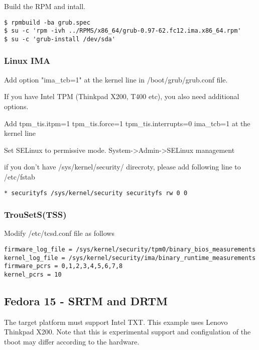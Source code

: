 Build the RPM and intall.

\begin{lstlisting}[style=console, linewidth = 170mm]
$ rpmbuild -ba grub.spec
$ su -c 'rpm -ivh ../RPMS/x86_64/grub-0.97-62.fc12.ima.x86_64.rpm'
$ su -c 'grub-install /dev/sda'
\end{lstlisting}

\subsubsection{Linux IMA} 

Add option "ima\_tcb=1" at the kernel line in /boot/grub/grub.conf file.

If you have Intel TPM (Thinkpad X200, T400 etc), you also need additional options.

Add tpm\_tis.itpm=1 tpm\_tis.force=1 tpm\_tis.interrupts=0 ima\_tcb=1 at the kernel line

Set SELinux to permissive mode. System->Admin->SELinux management

if you don't have /sys/kernel/security/ direcroty, please add following line to /etc/fstab

\begin{lstlisting}[style=source_code]
    * securityfs /sys/kernel/security securityfs rw 0 0 
\end{lstlisting}

\subsubsection{TrouSetS(TSS)}

Modify /etc/tcsd.conf file as follows

\begin{lstlisting}[style=source_code]
firmware_log_file = /sys/kernel/security/tpm0/binary_bios_measurements
kernel_log_file = /sys/kernel/security/ima/binary_runtime_measurements
firmware_pcrs = 0,1,2,3,4,5,6,7,8
kernel_pcrs = 10
\end{lstlisting}

\subsection{Fedora 15 - SRTM and DRTM} 

The target platform must support Intel TXT.
This example uses Lenovo Thinkpad X200.
Note that this is experimental support 
and configulation of the tboot may differ according to the hardware.


